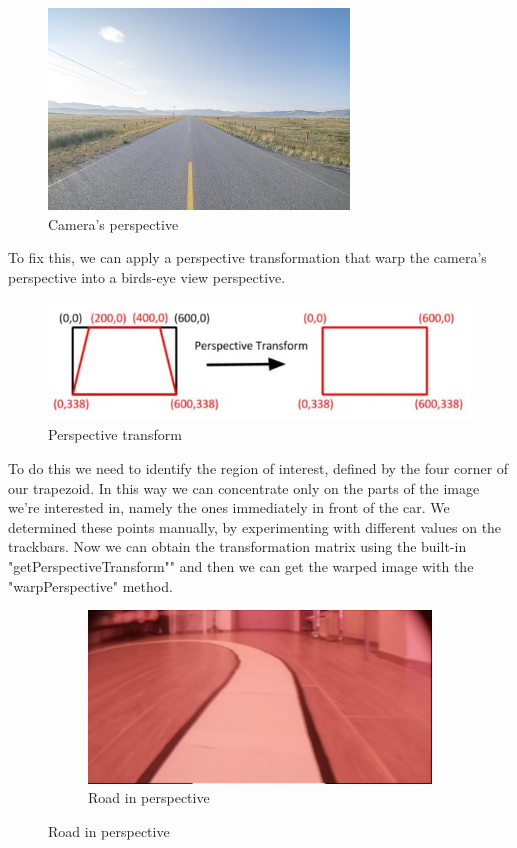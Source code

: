 \documentclass[12pt,a4paper]{article}
\begin{document}
\begin{large}
\begin{figure} [!htb]
\centering
\captionsetup{justification=centering}
\includegraphics[width=8cm]{images/road_endless_straight_vanishing.jpg}
\caption{Camera's perspective}
\end{figure}

To fix this, we can apply a perspective transformation that warp the camera's perspective into a birds-eye view perspective.

\begin{figure} [!hb]
  \centering
  \captionsetup{justification=centering}
  \includegraphics{images/perspective_transform.jpg}
  \caption{Perspective transform}
  \end{figure}

To do this we need to identify the region of interest, defined by the four corner of our trapezoid. In this way we can concentrate only on the parts of the image we're interested in, namely the ones immediately in front of the car. We determined these points manually, by experimenting with different values on the trackbars. Now we can obtain the transformation matrix using the built-in "getPerspectiveTransform"" and then we can get the warped image with the "warpPerspective" method.

\begin{figure} [!hbp]
  \centering
    \begin{subfigure}[b]{0.3\textwidth}
    \centering
    \captionsetup{justification=centering}
      \includegraphics[width=\textwidth]{images/camera_perspective.png}
      \caption{Road in perspective}
      

\end{subfigure}
\end{figure}
\end{large}
\end{document}

